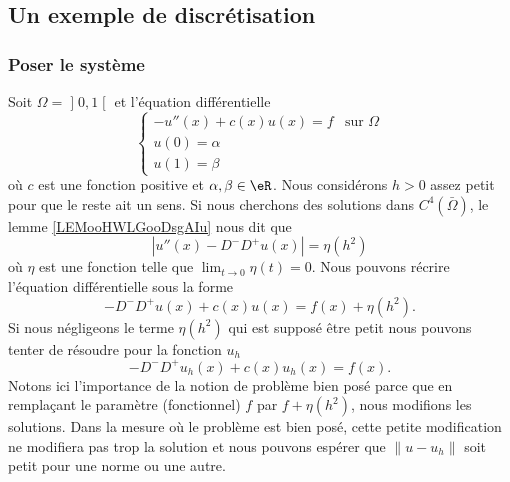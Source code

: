 \subsection{Un exemple de discrétisation}

\subsubsection{Poser le système}

Soit \( \Omega=\mathopen] 0 , 1 \mathclose[\) et l'équation différentielle
\begin{equation}        \label{EQooXJBWooRhCsLy}
     \begin{cases}
         -u''(x)+c(x)u(x)=f    &   \text{sur } \Omega\\
         u(0)=\alpha\\
         u(1)=\beta
     \end{cases}
\end{equation}
où \( c\) est une fonction positive et \( \alpha,\beta\in \eR\). Nous considérons \( h>0\) assez petit pour que le reste ait un sens. Si nous cherchons des solutions dans \( C^4(\bar\Omega)\), le lemme \ref{LEMooHWLGooDsgAIu} nous dit que 
\begin{equation}
    | u''(x)-D^-D^+u(x) |=\eta(h^2)
\end{equation}
où \( \eta\) est une fonction telle que \( \lim_{t\to 0} \eta(t)=0\). Nous pouvons récrire l'équation différentielle sous la forme
\begin{equation}
    -D^-D^+u(x)+c(x)u(x)=f(x)+\eta(h^2).
\end{equation}
Si nous négligeons le terme \( \eta(h^2)\) qui est supposé être petit nous pouvons tenter de résoudre pour la fonction \( u_h\)
\begin{equation}
    -D^-D^+u_h(x)+c(x)u_h(x)=f(x).
\end{equation}
Notons ici l'importance de la notion de problème bien posé parce que en remplaçant le paramètre (fonctionnel) \( f\) par \( f+\eta(h^2)\), nous modifions les solutions. Dans la mesure où le problème est bien posé, cette petite modification ne modifiera pas trop la solution et nous pouvons espérer que \( \| u-u_h \|\) soit petit pour une norme ou une autre.

